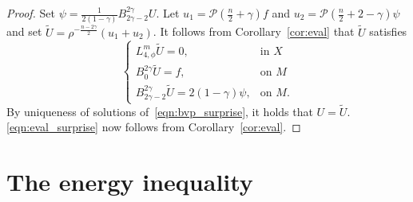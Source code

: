 \documentclass{amsart}
\theoremstyle{definition}
\theoremstyle{remark}
\numberwithin{equation}{section}
\begin{document}
\begin{proof}
 Set $\psi=\frac{1}{2(1-\gamma)}B_{2\gamma-2}^{2\gamma}U$.  Let $u_1={\mathcal{P}}\left(\frac{n}{2}+\gamma\right)f$ and $u_2={\mathcal{P}}\left(\frac{n}{2}+2-\gamma\right)\psi$ and set $\tilde U=\rho^{-\frac{n-2\gamma}{2}}(u_1+u_2)$.  It follows from Corollary~\ref{cor:eval} that $\tilde U$ satisfies
 \begin{equation}
  \label{eqn:bvp_surprise}
  \begin{cases}
   L_{4,\phi}^m\tilde U = 0, & \text{in $X$} \\
   B_{0}^{2\gamma}\tilde U = f, & \text{on $M$} \\
   B_{2\gamma-2}^{2\gamma}\tilde U = 2(1-\gamma)\psi, & \text{on $M$}.
  \end{cases}
 \end{equation}
 By uniqueness of solutions of~\eqref{eqn:bvp_surprise}, it holds that $U=\tilde U$.  \eqref{eqn:eval_surprise} now follows from Corollary~\ref{cor:eval}.
\end{proof}

\section{The energy inequality}
\label{sec:inequality}
\end{document}
